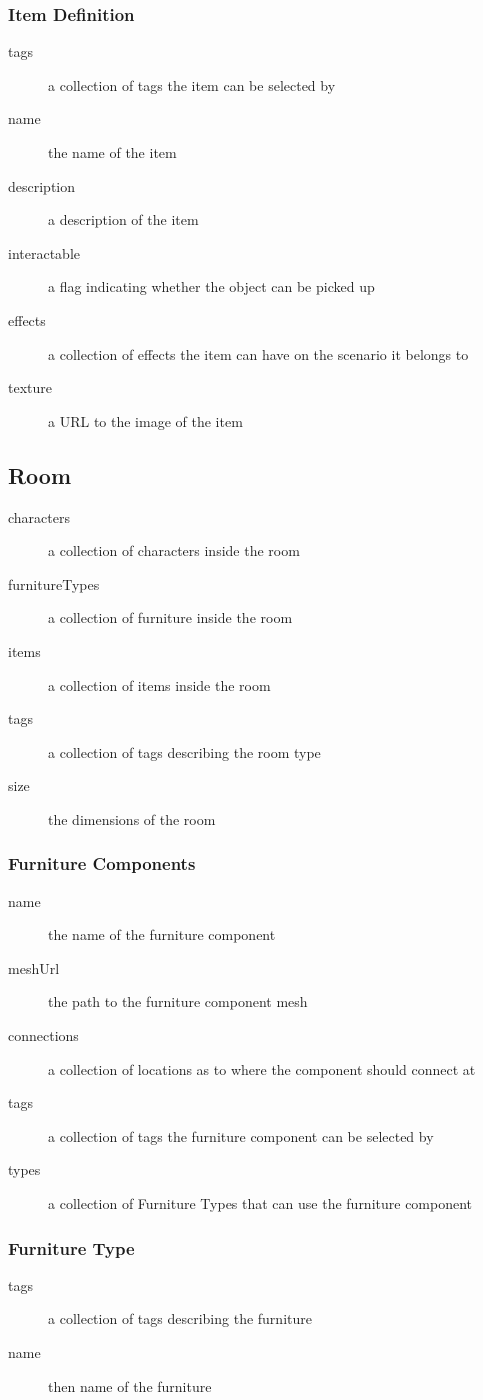 \subsubsection{Item Definition}
\begin{description}
\item[tags]{a collection of tags the item can be selected by}
\item[name]{the name of the item}
\item[description]{a description of the item}
\item[interactable]{a flag indicating whether the object can be picked up}
\item[effects]{a collection of effects the item can have on the scenario it belongs to}
\item[texture]{a URL to the image of the item}
\end{description}

\subsection{Room}
\begin{description}
\item[characters]{a collection of characters inside the room}
\item[furnitureTypes]{a collection of furniture inside the room}
\item[items]{a collection of items inside the room}
\item[tags]{a collection of tags describing the room type}
\item[size]{the dimensions of the room}
\end{description}

\subsubsection{Furniture Components}
\begin{description}
\item[name]{the name of the furniture component}
\item[meshUrl]{the path to the furniture component mesh}
\item[connections]{a collection of locations as to where the component should connect at}
\item[tags]{a collection of tags the furniture component can be selected by}
\item[types]{a collection of Furniture Types that can use the furniture component}
\end{description}

\subsubsection{Furniture Type}
\begin{description}
\item[tags]{a collection of tags describing the furniture}
\item[name]{then name of the furniture}
\end{description}

